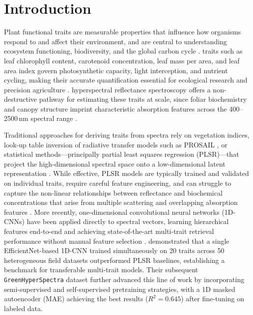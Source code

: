 \section{Introduction}
\label{sec:introduction}

Plant functional traits are measurable properties that influence how organisms respond to and affect their environment, and are central to understanding ecosystem functioning, biodiversity, and the global carbon cycle \citep{kattge2020try}.  traits such as leaf chlorophyll content, carotenoid concentration, leaf mass per area, and leaf area index govern photosynthetic capacity, light interception, and nutrient cycling, making their accurate quantification essential for ecological research and precision agriculture \citep{homolova2013review}.  hyperspectral reflectance spectroscopy offers a non-destructive pathway for estimating these traits at scale, since foliar biochemistry and canopy structure imprint characteristic absorption features across the 400--2500\,nm spectral range \citep{curran1989imaging, fu2020photosynthetic}. 

Traditional approaches for deriving traits from spectra rely on vegetation indices, look-up table inversion of radiative transfer models such as PROSAIL \citep{feret2021prospectpro, ferreira2025enhancing}, or statistical methods---principally partial least squares regression (PLSR)---that project the high-dimensional spectral space onto a low-dimensional latent representation \citep{fu2020photosynthetic, ji2024unveiling}. While effective, PLSR models are typically trained and validated on individual traits, require careful feature engineering, and can struggle to capture the non-linear relationships between reflectance and biochemical concentrations that arise from multiple scattering and overlapping absorption features \citep{verhoef2007sail}. More recently, one-dimensional convolutional neural networks (1D-CNNs) have been applied directly to spectral vectors, learning hierarchical features end-to-end and achieving state-of-the-art multi-trait retrieval performance without manual feature selection \citep{cherif2023spectra, furbank2021wheat}. \citet{cherif2023spectra} demonstrated that a single EfficientNet-based 1D-CNN trained simultaneously on 20 traits across 50 heterogeneous field datasets outperformed PLSR baselines, establishing a benchmark for transferable multi-trait models. Their subsequent \texttt{GreenHyperSpectra} dataset \citep{cherif2025greenhyperspectra} further advanced this line of work by incorporating semi-supervised and self-supervised pretraining strategies, with a 1D masked autoencoder (MAE) achieving the best results ($R^2 = 0.645$) after fine-tuning on labeled data.

